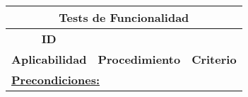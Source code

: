 \begin{table}[H]
\centering
\begin{tabular}{lcc}
\hline
\multicolumn{3}{|c|}{\cellcolor[HTML]{FFD966}Tests de Funcionalidad}                                                                                                                                                                                                                                                                                                                                                                                                                                                                                                                                                                                                                                                                                              \\ \hline
\multicolumn{1}{c}{\textbf{ID}}                                         &                                                                                                                                                                                                                                                                                                                                                                                                                                                                                  &                                                                                                                                                                                                      \\
\multicolumn{1}{c}{\textbf{Aplicabilidad}}                              & \multirow{-2}{*}{\textbf{Procedimiento}}                                                                                                                                                                                                                                                                                                                                                                                                                                         & \multirow{-2}{*}{\textbf{Criterio}}                                                                                                                                                                  \\
\multicolumn{3}{l}{{\ul \textbf{Precondiciones:}}}                                                                                                                                                                                                                                                                                                                                                                                                                                                                                                                                                                                                                                                                                                                \\

\end{tabular}
\end{table}
